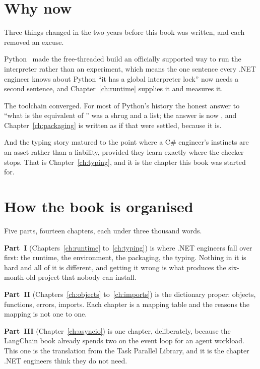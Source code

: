 
\section*{Why now}

Three things changed in the two years before this book was written, and each
removed an excuse.

Python~\pyver{} made the free-threaded build an officially supported way to
run the interpreter rather than an experiment, which means the one sentence
every .NET engineer knows about Python \dash{} \enquote{it has a global
interpreter lock} \dash{} now needs a second sentence, and
Chapter~\ref{ch:runtime} supplies it and measures it.

The toolchain converged. For most of Python's history the honest answer to
\enquote{what is the equivalent of } was a shrug and a
list; the answer is now , and Chapter~\ref{ch:packaging} is written as
if that were settled, because it is.

And the typing story matured to the point where a C\# engineer's instincts are
an asset rather than a liability, provided they learn exactly where the checker
stops. That is Chapter~\ref{ch:typing}, and it is the chapter this book was
started for.

\section*{How the book is organised}

Five parts, fourteen chapters, each under three thousand words.

\textbf{Part~I \dash{} \lblPartI} (Chapters~\ref{ch:runtime}
to~\ref{ch:typing}) is where .NET engineers fall over first: the runtime, the
environment, the packaging, the typing. Nothing in it is hard and all of it is
different, and getting it wrong is what produces the six-month-old project
that nobody can install.

\textbf{Part~II \dash{} \lblPartII} (Chapters~\ref{ch:objects}
to~\ref{ch:imports}) is the dictionary proper: objects, functions, errors,
imports. Each chapter is a mapping table and the reasons the mapping is not
one to one.

\textbf{Part~III \dash{} \lblPartIII} (Chapter~\ref{ch:asyncio}) is one
chapter, deliberately, because the LangChain book already spends two on the
event loop for an agent workload. This one is the translation from the Task
Parallel Library, and it is the chapter .NET engineers think they do not need.


